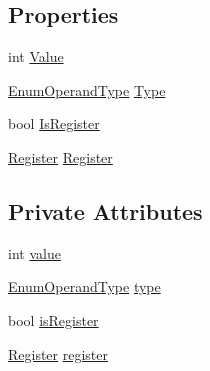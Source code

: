 \subsection*{Properties}
\begin{DoxyCompactItemize}
\item 
int \hyperlink{class_c_p_u___o_s___simulator_1_1_c_p_u_1_1_operand_ab109292eba2094db4d7f21cbdbd5bc9e}{Value}
\item 
\hyperlink{namespace_c_p_u___o_s___simulator_1_1_c_p_u_ad49cfe442b74115a326c03b7ae848f76}{Enum\+Operand\+Type} \hyperlink{class_c_p_u___o_s___simulator_1_1_c_p_u_1_1_operand_a0b0deae57b760df3a083dc54535b0891}{Type}
\item 
bool \hyperlink{class_c_p_u___o_s___simulator_1_1_c_p_u_1_1_operand_a662aacb6eb1aa9cf818181aea695e0c9}{Is\+Register}
\item 
\hyperlink{class_c_p_u___o_s___simulator_1_1_c_p_u_1_1_register}{Register} \hyperlink{class_c_p_u___o_s___simulator_1_1_c_p_u_1_1_operand_a8f08360f0e27922fc0377f5d58a9e67f}{Register}
\end{DoxyCompactItemize}
\subsection*{Private Attributes}
\begin{DoxyCompactItemize}
\item 
int \hyperlink{class_c_p_u___o_s___simulator_1_1_c_p_u_1_1_operand_a59d05c39a45091805c9506b1852f9bde}{value}
\item 
\hyperlink{namespace_c_p_u___o_s___simulator_1_1_c_p_u_ad49cfe442b74115a326c03b7ae848f76}{Enum\+Operand\+Type} \hyperlink{class_c_p_u___o_s___simulator_1_1_c_p_u_1_1_operand_abc8f504a22e9a5c49d91b12f61cc5119}{type}
\item 
bool \hyperlink{class_c_p_u___o_s___simulator_1_1_c_p_u_1_1_operand_a16cc03d0d4c600b864d9c189529a473d}{is\+Register}
\item 
\hyperlink{class_c_p_u___o_s___simulator_1_1_c_p_u_1_1_register}{Register} \hyperlink{class_c_p_u___o_s___simulator_1_1_c_p_u_1_1_operand_a55d446765a50844fcbbc56b757b1b679}{register}
\end{DoxyCompactItemize}


